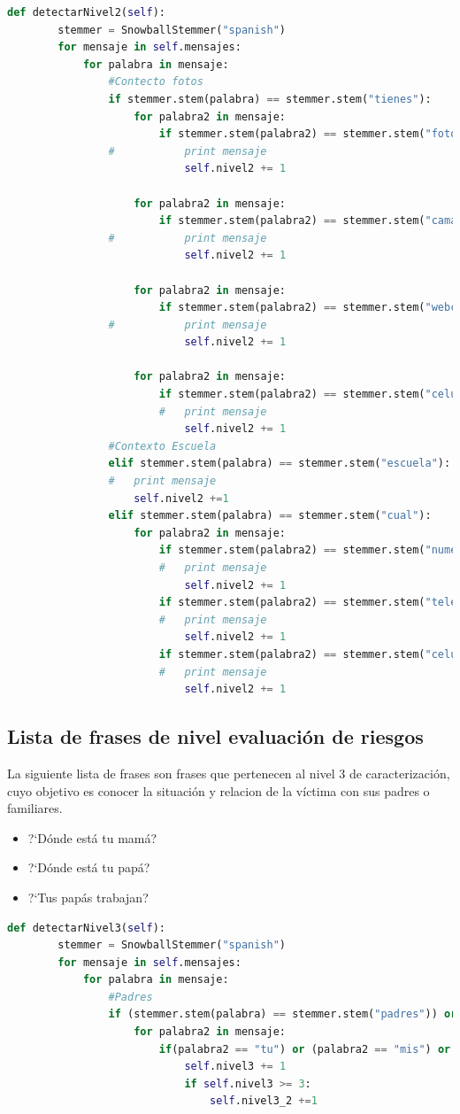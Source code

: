 \begin{lstlisting}[language=Python]
def detectarNivel2(self):
		stemmer = SnowballStemmer("spanish")
		for mensaje in self.mensajes:
			for palabra in mensaje:
				#Contecto fotos
				if stemmer.stem(palabra) == stemmer.stem("tienes"):
					for palabra2 in mensaje:
						if stemmer.stem(palabra2) == stemmer.stem("fotos"):
				#			print mensaje
							self.nivel2 += 1
				
					for palabra2 in mensaje:
						if stemmer.stem(palabra2) == stemmer.stem("camara"):
				#			print mensaje
							self.nivel2 += 1
					
					for palabra2 in mensaje:
						if stemmer.stem(palabra2) == stemmer.stem("webcam"):
				#			print mensaje
							self.nivel2 += 1
					
					for palabra2 in mensaje:
						if stemmer.stem(palabra2) == stemmer.stem("celular"):
						#	print mensaje	
							self.nivel2 += 1
				#Contexto Escuela
				elif stemmer.stem(palabra) == stemmer.stem("escuela"):
				#	print mensaje
					self.nivel2 +=1		
				elif stemmer.stem(palabra) == stemmer.stem("cual"):	
					for palabra2 in mensaje:
						if stemmer.stem(palabra2) == stemmer.stem("numero"):
						#	print mensaje	
							self.nivel2 += 1
						if stemmer.stem(palabra2) == stemmer.stem("telefono"):
						#	print mensaje	
							self.nivel2 += 1	
						if stemmer.stem(palabra2) == stemmer.stem("celular"):
						#	print mensaje	
							self.nivel2 += 1


\end{lstlisting}

\subsection{Lista de frases de nivel evaluaci\'on de riesgos}
La siguiente lista de frases son frases que pertenecen al nivel 3 de caracterizaci\'on, cuyo objetivo es conocer la situaci\'on y relacion de la v\'ictima con sus padres o familiares.  


\begin{itemize}
\item ?`D\'onde est\'a tu mam\'a?
\item ?`D\'onde est\'a tu pap\'a?
\item ?`Tus pap\'as trabajan?
\end{itemize}

\begin{lstlisting}[language=Python]
def detectarNivel3(self):
		stemmer = SnowballStemmer("spanish")
		for mensaje in self.mensajes:
			for palabra in mensaje:
				#Padres
				if (stemmer.stem(palabra) == stemmer.stem("padres")) or (stemmer.stem(palabra) == stemmer.stem("papa")) or (stemmer.stem(palabra) == stemmer.stem("mama")) or (stemmer.stem(palabra) == stemmer.stem("padres")) or (stemmer.stem(palabra) == stemmer.stem("madre")): 
					for palabra2 in mensaje:
						if(palabra2 == "tu") or (palabra2 == "mis") or (palabra2 == "mi") or (palabra2 ==  "tus") or (palabra2 =="tu"):
							self.nivel3 += 1
							if self.nivel3 >= 3:
								self.nivel3_2 +=1 
	
\end{lstlisting}

